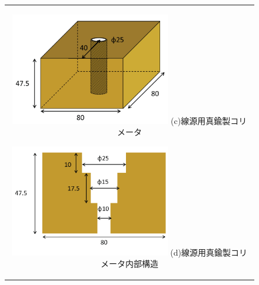 \begin{figure}[H]
	\centering
		\begin{tabular}{c}
			\begin{minipage}{0.5\hsize}
				\centering
					\includegraphics[width=70mm]{fig/isb/collimator3.png}
					\hspace{1.6cm} (c)線源用真鍮製コリメータ
			\end{minipage}
			\begin{minipage}{0.5\hsize}
				\centering
					\includegraphics[width=70mm]{fig/isb/collimator4.png}
					\hspace{1.6cm} (d)線源用真鍮製コリメータ内部構造
			\end{minipage}
		\end{tabular}
	\end{figure}
